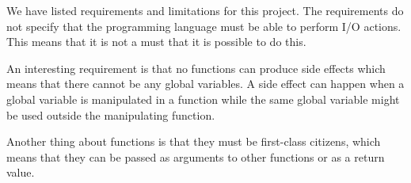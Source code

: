 We have listed requirements and limitations for this project. The requirements
do not specify that the programming language must be able to perform I/O
actions. This means that it is not a must that it is possible to do this.

An interesting requirement is that no functions can produce side effects which
means that there cannot be any global variables. A side effect can happen when a
global variable is manipulated in a function while the same global variable
might be used outside the manipulating function. 

Another thing about functions is that they must be first-class citizens, which
means that they can be passed as arguments to other functions or as a return
value.
